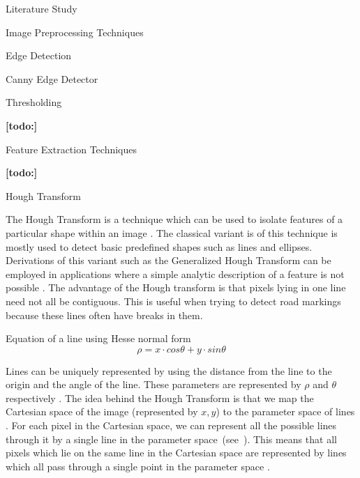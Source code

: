 \documentclass{matthijs}
\begin{document}
\begin{hoofdstuk}{Literature Study}
\begin{paragraaf}{Image Preprocessing Techniques}
\begin{subparagraaf}{Edge Detection}
\begin{subsubparagraaf}{Canny Edge Detector}
				\end{subsubparagraaf}

			\end{subparagraaf}

			\begin{subparagraaf}{Thresholding}

				\textbf{[todo:]}

			\end{subparagraaf}

		\end{paragraaf}

		\begin{paragraaf}{Feature Extraction Techniques}

			\textbf{[todo:]}

			\begin{subparagraaf}{Hough Transform}

				The Hough Transform is a technique which can be used to isolate features of a particular shape within an image \cite{fisher2003hypermedia}.
				The classical variant is of this technique is mostly used to detect basic predefined shapes such as lines and ellipses.
				Derivations of this variant such as the Generalized Hough Transform can be employed in applications where a simple analytic description of a feature is not possible \cite{fisher2003hypermedia}.
				The advantage of the Hough transform is that pixels lying in one line need not all be contiguous.\cite{kahl2000hough}
				This is useful when trying to detect road markings because these lines often have breaks in them.

				\begin{figuur}{Equation of a line using Hesse normal form}
					\begin{equation*}
						\rho = x \cdot cos \theta + y \cdot sin \theta
					\end{equation*}\cite{caltech2009line}
				\end{figuur}

				Lines can be uniquely represented by using the distance from the line to the origin and the angle of the line.
				These parameters are represented by $\rho$ and $\theta$ respectively \cite{caltech2009line}.
				The idea behind the Hough Transform is that we map the Cartesian space of the image (represented by $x,y$) to the parameter space of lines \cite{solberg2009hough}.
				For each pixel in the Cartesian space, we can represent all the possible lines through it by a single line in the parameter \mbox{space (see ).}
				This means that all pixels which lie on the same line in the Cartesian space are represented by lines which all pass through a single point in the parameter space \cite{kahl2000hough}.


\end{subparagraaf}
\end{paragraaf}
\end{hoofdstuk}
\end{document}
